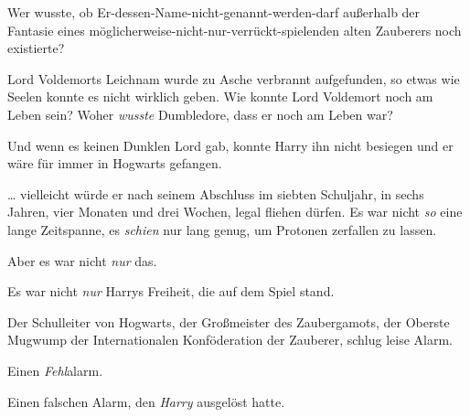 Wer wusste, ob Er-dessen-Name-nicht-genannt-werden-darf außerhalb der Fantasie eines möglicherweise-nicht-nur-verrückt-spielenden alten Zauberers noch existierte?

Lord Voldemorts Leichnam wurde zu Asche verbrannt aufgefunden, so etwas wie Seelen konnte es nicht wirklich geben. Wie konnte Lord Voldemort noch am Leben sein? Woher \emph{wusste} Dumbledore, dass er noch am Leben war?

Und wenn es keinen Dunklen Lord gab, konnte Harry ihn nicht besiegen und er wäre für immer in Hogwarts gefangen.

… vielleicht würde er nach seinem Abschluss im siebten Schuljahr, in sechs Jahren, vier Monaten und drei Wochen, legal fliehen dürfen. Es war nicht \emph{so} eine lange Zeitspanne, es \emph{schien} nur lang genug, um Protonen zerfallen zu lassen.

Aber es war nicht \emph{nur} das.

Es war nicht \emph{nur} Harrys Freiheit, die auf dem Spiel stand.

Der Schulleiter von Hogwarts, der Großmeister des Zaubergamots, der Oberste Mugwump der Internationalen Konföderation der Zauberer, schlug leise Alarm.

Einen \emph{Fehl}{}alarm.

Einen falschen Alarm, den \emph{Harry} ausgelöst hatte.

